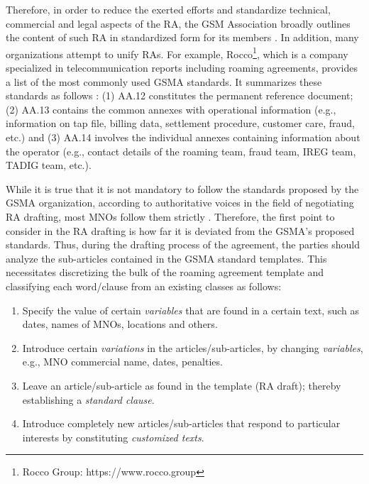 \documentclass[conference]{style/IEEEtran}
\begin{document}
Therefore, in order to reduce the exerted efforts and standardize technical, commercial and legal aspects of the RA, the GSM Association broadly outlines the content of such RA in standardized form for its members \cite{Ferwerda2018}. 
In addition, many organizations attempt to unify RAs. For example, Rocco\footnote{Rocco Group: https://www.rocco.group}, which is a company specialized in telecommunication reports including roaming agreements, provides a list of the most commonly used GSMA standards. It summarizes these standards as follows \cite{ROCCO2017}: (1) AA.12 constitutes the permanent reference document; (2) AA.13 contains the common annexes with operational information (e.g., information on tap file, billing data, settlement procedure, customer care, fraud, etc.) and (3) AA.14 involves the individual annexes containing information about the operator (e.g., contact details of the roaming team, fraud team, IREG team, TADIG team, etc.).

While it is true that it is not mandatory to follow the standards proposed by the GSMA organization, according to authoritative voices in the field of negotiating RA drafting, most MNOs follow them strictly \cite{ROCCO2017a}. Therefore, the first point to consider in the RA drafting is how far it is deviated from the GSMA's proposed standards. Thus, during the drafting process of the agreement, the parties should analyze the sub-articles contained in the GSMA standard templates. This necessitates discretizing the bulk of the roaming agreement template and classifying each word/clause from an existing classes as follows:

\begin{enumerate}
\item Specify the value of certain \textit{variables} that are found in a certain text, such as dates, names of MNOs, locations and others.
\item Introduce certain \textit{variations} in the articles/sub-articles, by changing \textit{variables}, e.g., MNO commercial name, dates, penalties.
\item Leave an article/sub-article as found in the template (RA draft); thereby establishing a \textit{standard clause}.
\item Introduce completely new articles/sub-articles that respond to particular interests by constituting \textit{customized texts}.
\end{enumerate}
\end{document}
